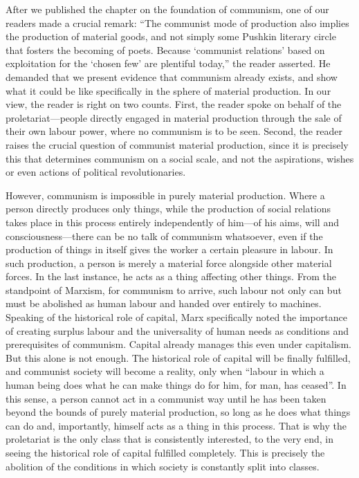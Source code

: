 \documentclass[12pt,a4paper,openany]{book}
\begin{document}
After we published the chapter on the foundation of communism, one of our readers made a crucial remark: “The communist mode of production also implies the production of material goods, and not simply some Pushkin literary circle that fosters the becoming of poets. Because ‘communist relations’ based on exploitation for the ‘chosen few’ are plentiful today,” the reader asserted. He demanded that we present evidence that communism already exists, and show what it could be like specifically in the sphere of material production. In our view, the reader is right on two counts. First, the reader spoke on behalf of the proletariat—people directly engaged in material production through the sale of their own labour power, where no communism is to be seen. Second, the reader raises the crucial question of communist material production, since it is precisely this that determines communism on a social scale, and not the aspirations, wishes or even actions of political revolutionaries.

However, communism is impossible in purely material production. Where a person directly produces only things, while the production of social relations takes place in this process entirely independently of him—of his aims, will and consciousness—there can be no talk of communism whatsoever, even if the production of things in itself gives the worker a certain pleasure in labour. In such production, a person is merely a material force alongside other material forces. In the last instance, he acts as a thing affecting other things. From the standpoint of Marxism, for communism to arrive, such labour not only can but must be abolished as human labour and handed over entirely to machines. Speaking of the historical role of capital, Marx specifically noted the importance of creating surplus labour and the universality of human needs as conditions and prerequisites of communism. Capital already manages this even under capitalism. But this alone is not enough. The historical role of capital will be finally fulfilled, and communist society will become a reality, only when “labour in which a human being does what he can make things do for him, for man, has ceased”. In this sense, a person cannot act in a communist way until he has been taken beyond the bounds of purely material production, so long as he does what things can do and, importantly, himself acts as a thing in this process. That is why the proletariat is the only class that is consistently interested, to the very end, in seeing the historical role of capital fulfilled completely. This is precisely the abolition of the conditions in which society is constantly split into classes.
\end{document}
